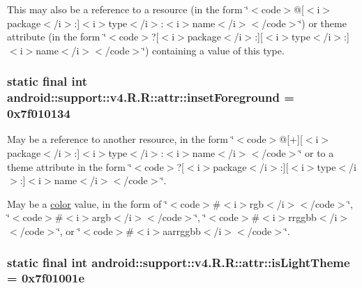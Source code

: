 This may also be a reference to a resource (in the form \char`\"{}$<$code$>$@\mbox{[}$<$i$>$package$<$/i$>$:\mbox{]}$<$i$>$type$<$/i$>$:$<$i$>$name$<$/i$>$$<$/code$>$\char`\"{}) or theme attribute (in the form \char`\"{}$<$code$>$?\mbox{[}$<$i$>$package$<$/i$>$:\mbox{]}\mbox{[}$<$i$>$type$<$/i$>$:\mbox{]}$<$i$>$name$<$/i$>$$<$/code$>$\char`\"{}) containing a value of this type. \hypertarget{classandroid_1_1support_1_1v4_1_1_r_1_1attr_00133cc665cd793fdc9c26ef4e822c57}{
\subsubsection[{insetForeground}]{\setlength{\rightskip}{0pt plus 5cm}static final int android::support::v4.R.R::attr::insetForeground = 0x7f010134}}
\label{classandroid_1_1support_1_1v4_1_1_r_1_1attr_00133cc665cd793fdc9c26ef4e822c57}


May be a reference to another resource, in the form \char`\"{}$<$code$>$@\mbox{[}+\mbox{]}\mbox{[}$<$i$>$package$<$/i$>$:\mbox{]}$<$i$>$type$<$/i$>$:$<$i$>$name$<$/i$>$$<$/code$>$\char`\"{} or to a theme attribute in the form \char`\"{}$<$code$>$?\mbox{[}$<$i$>$package$<$/i$>$:\mbox{]}\mbox{[}$<$i$>$type$<$/i$>$:\mbox{]}$<$i$>$name$<$/i$>$$<$/code$>$\char`\"{}. 

May be a \hyperlink{classandroid_1_1support_1_1v4_1_1_r_1_1color}{color} value, in the form of \char`\"{}$<$code$>$\#$<$i$>$rgb$<$/i$>$$<$/code$>$\char`\"{}, \char`\"{}$<$code$>$\#$<$i$>$argb$<$/i$>$$<$/code$>$\char`\"{}, \char`\"{}$<$code$>$\#$<$i$>$rrggbb$<$/i$>$$<$/code$>$\char`\"{}, or \char`\"{}$<$code$>$\#$<$i$>$aarrggbb$<$/i$>$$<$/code$>$\char`\"{}. \hypertarget{classandroid_1_1support_1_1v4_1_1_r_1_1attr_6b0fb4a730781cf3f05c71c7f7ebb0b6}{
\subsubsection[{isLightTheme}]{\setlength{\rightskip}{0pt plus 5cm}static final int android::support::v4.R.R::attr::isLightTheme = 0x7f01001e}}
\label{classandroid_1_1support_1_1v4_1_1_r_1_1attr_6b0fb4a730781cf3f05c71c7f7ebb0b6}


